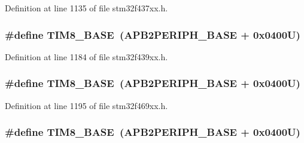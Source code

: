 Definition at line 1135 of file stm32f437xx.\+h.

\subsubsection[{\texorpdfstring{T\+I\+M8\+\_\+\+B\+A\+SE}{TIM8_BASE}}]{\setlength{\rightskip}{0pt plus 5cm}\#define T\+I\+M8\+\_\+\+B\+A\+SE~({\bf A\+P\+B2\+P\+E\+R\+I\+P\+H\+\_\+\+B\+A\+SE} + 0x0400\+U)}\hypertarget{group___peripheral__memory__map_ga5b72f698b7a048a6f9fcfe2efe5bc1db}{}\label{group___peripheral__memory__map_ga5b72f698b7a048a6f9fcfe2efe5bc1db}


Definition at line 1184 of file stm32f439xx.\+h.

\subsubsection[{\texorpdfstring{T\+I\+M8\+\_\+\+B\+A\+SE}{TIM8_BASE}}]{\setlength{\rightskip}{0pt plus 5cm}\#define T\+I\+M8\+\_\+\+B\+A\+SE~({\bf A\+P\+B2\+P\+E\+R\+I\+P\+H\+\_\+\+B\+A\+SE} + 0x0400\+U)}\hypertarget{group___peripheral__memory__map_ga5b72f698b7a048a6f9fcfe2efe5bc1db}{}\label{group___peripheral__memory__map_ga5b72f698b7a048a6f9fcfe2efe5bc1db}


Definition at line 1195 of file stm32f469xx.\+h.

\subsubsection[{\texorpdfstring{T\+I\+M8\+\_\+\+B\+A\+SE}{TIM8_BASE}}]{\setlength{\rightskip}{0pt plus 5cm}\#define T\+I\+M8\+\_\+\+B\+A\+SE~({\bf A\+P\+B2\+P\+E\+R\+I\+P\+H\+\_\+\+B\+A\+SE} + 0x0400\+U)}\hypertarget{group___peripheral__memory__map_ga5b72f698b7a048a6f9fcfe2efe5bc1db}{}\label{group___peripheral__memory__map_ga5b72f698b7a048a6f9fcfe2efe5bc1db}


